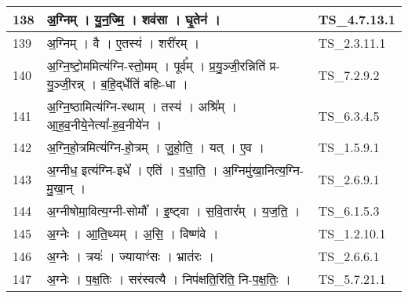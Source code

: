 \documentclass[17pt]{extarticle}
\begin{document}
\begin{longtable}{||p{0.4in}||p{4.9in}||p{0.9in}||}
    \hline
        
    138 & अ॒ग्निम्   ।   यु॒न॒ज्मि॒   ।   शव॑सा   ।   घृ॒तेन॑   ।    & TS\_4.7.13.1       \\
    
    \hline
        
    139 & अ॒ग्निम्   ।   वै   ।   ए॒तस्य॑   ।   शरी॑रम्   ।    & TS\_2.3.11.1       \\
    
    \hline
        
    140 & अ॒ग्नि॒ष्टो॒ममित्य॑ग्नि{-}स्तो॒मम्   ।   पूर्व᳚म्   ।   प्र॒यु॒ञ्जी॒रन्निति॑ प्र{-}यु॒ञ्जी॒रन्न्   ।   ब॒हि॒द्‌र्धेति॑ बहिः{-}धा   ।    & TS\_7.2.9.2       \\
    
    \hline
        
    141 & अ॒ग्नि॒ष्ठामित्य॑ग्नि{-}स्थाम्   ।   तस्य॑   ।   अश्रि᳚म्   ।   आ॒ह॒व॒नीये॒नेत्या᳚{-}ह॒व॒नीये॑न   ।    & TS\_6.3.4.5       \\
    
    \hline
        
    142 & अ॒ग्नि॒हो॒त्रमित्य॑ग्नि{-}हो॒त्रम्   ।   जु॒हो॒ति॒   ।   यत्   ।   ए॒व   ।    & TS\_1.5.9.1       \\
    
    \hline
        
    143 & अ॒ग्नीध॒ इत्य॑ग्नि{-}इधे᳚   ।   एति॑   ।   द॒धा॒ति॒   ।   अ॒ग्निमु॑खा॒नित्य॒ग्नि{-}मु॒खा॒न्   ।    & TS\_2.6.9.1       \\
    
    \hline
        
    144 & अ॒ग्नीषोमा॒वित्य॒ग्नी{-}सोमौ᳚   ।   इ॒ष्ट्वा   ।   स॒वि॒तार᳚म्   ।   य॒ज॒ति॒   ।    & TS\_6.1.5.3       \\
    
    \hline
        
    145 & अ॒ग्नेः   ।   आ॒ति॒थ्यम्   ।   अ॒सि॒   ।   विष्ण॑वे   ।    & TS\_1.2.10.1       \\
    
    \hline
        
    146 & अ॒ग्नेः   ।   त्रयः॑   ।   ज्यायाꣳ॑सः   ।   भ्रात॑रः   ।    & TS\_2.6.6.1       \\
    
    \hline
        
    147 & अ॒ग्नेः   ।   प॒क्ष॒तिः   ।   सर॑स्वत्यै   ।   निप॑क्षति॒रिति॒ नि{-}प॒क्ष॒तिः॒   ।    & TS\_5.7.21.1       \\
    

\end{longtable}
\end{document}
